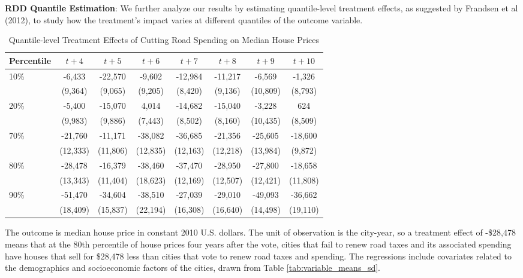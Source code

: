\textbf{RDD Quantile Estimation}: We further analyze our results by estimating quantile-level treatment effects, as suggested by Frandsen et al (2012), to study how the treatment’s impact varies at different quantiles of the outcome variable. 

\begin{table}[ht]
    \hspace{-1cm}
    \caption{Quantile-level Treatment Effects of Cutting Road Spending on Median House Prices}
    \label{tab:quantile_tes}
    \begin{tabular}{p{1.5cm}ccccccc}
        \hline
        Percentile & $t + 4$ & $t + 5$ & $t + 6$ & $t + 7$ & $t + 8$ & $t + 9$ & $t + 10$ \\
        \hline
        10\% & -6,433 & -22,570 & -9,602 & -12,984 & -11,217 & -6,569 & -1,326 \\
        & (9,364) & (9,065) & (9,205) & (8,420) & (9,136) & (10,809) & (8,793) \\
        20\% & -5,400 & -15,070 & 4,014 & -14,682 & -15,040 & -3,228 & 624 \\
        & (9,983) & (9,886) & (7,443) & (8,502) & (8,160) & (10,435) & (8,509) \\
        70\% & -21,760 & -11,171 & -38,082 & -36,685 & -21,356 & -25,605 & -18,600 \\
        & (12,333) & (11,806) & (12,835) & (12,163) & (12,218) & (13,984) & (9,872) \\
        80\% & -28,478 & -16,379 & -38,460 & -37,470 & -28,950 & -27,800 & -18,658 \\
        & (13,343) & (11,404) & (18,623) & (12,169) & (12,507) & (12,421) & (11,808) \\
        90\% & -51,470 & -34,604 & -38,510 & -27,039 & -29,010 & -49,093 & -36,662 \\
        & (18,409) & (15,837) & (22,194) & (16,308) & (16,640) & (14,498) & (19,110) \\
        \hline
    \end{tabular}
    \begin{tablenotes}
        \small
        \item The outcome is median house price in constant 2010 U.S. dollars. The unit of observation is the city-year, so a treatment effect of -\$28,478 means that at the 80th percentile of house prices four years after the vote, cities that fail to renew road taxes and its associated spending have houses that sell for \$28,478 less than cities that vote to renew road taxes and spending. The regressions include covariates related to the demographics and socioeconomic factors of the cities, drawn from Table \ref{tab:variable_means_sd}.
    \end{tablenotes}
\end{table}

